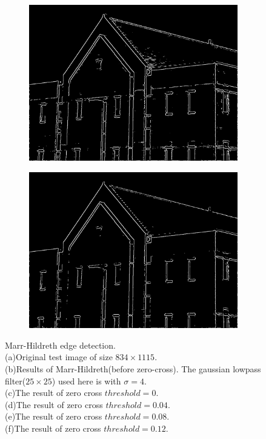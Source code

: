 \begin{figure}[h!]
\begin{subfigure}[b]{0.45\linewidth}
		\includegraphics[width=\linewidth]{myfigure/p9/9_zerocross_8.png}
		\caption{}
		\label{fig:zerocross_8}
	\end{subfigure}
	\begin{subfigure}[b]{0.45\linewidth}
		\includegraphics[width=\linewidth]{myfigure/p9/9_zerocross_12.png}
		\caption{}
		\label{fig:zerocross_12}
	\end{subfigure}
	
	\caption{Marr-Hildreth edge detection. \\(a)Original test image of size $834 \times 1115$.\\ (b)Results of Marr-Hildreth(before zero-cross). The gaussian lowpass filter($25\times 25$) used here is with $\sigma=4$.\\  (c)The result of zero cross $threshold=0$.\\ (d)The result of zero cross $threshold=0.04$.\\ (e)The result of zero cross $threshold=0.08$.\\ (f)The result of zero cross $threshold=0.12$.}
  	\label{fig:marr_hildreth}
\end{figure}

